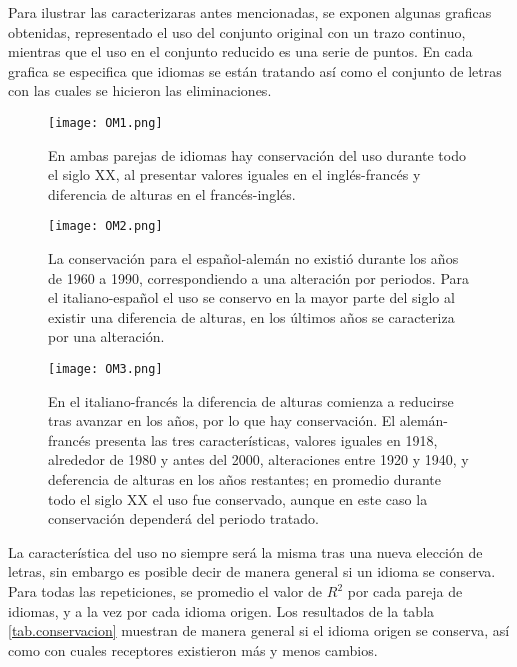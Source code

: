 Para ilustrar las caracterizaras antes mencionadas, se exponen algunas graficas obtenidas, representado el uso del conjunto original con un trazo continuo, mientras que el uso en el conjunto reducido  es una serie de puntos. En cada grafica se especifica que idiomas se están tratando así como el conjunto de letras con las cuales se hicieron las eliminaciones. 


\begin{figure}[h!]
	\centering
	\texttt{[image: OM1.png]}
	\label{fig.OM1}
	\caption{En ambas parejas de idiomas hay conservación del uso durante todo el siglo XX, al presentar valores iguales en el inglés-francés y  diferencia de alturas en el francés-inglés.}
\end{figure}


\begin{figure}[h!]
	\centering
	\texttt{[image: OM2.png]}
	\label{fig.OM2}
	\caption{La conservación para el español-alemán no existió durante los años de 1960 a 1990,  correspondiendo a una alteración por periodos. Para el italiano-español el uso se conservo  en la mayor parte del siglo al existir una diferencia de alturas, en los últimos años se caracteriza por una alteración.}
\end{figure}


\begin{figure}[h!]
	\centering
	\texttt{[image: OM3.png]}
	\label{fig.OM3}
	\caption{ En el italiano-francés la diferencia de alturas comienza a reducirse tras avanzar en los años, por lo que hay conservación. El alemán-francés  presenta las tres características,  valores iguales  en 1918, alrededor de 1980 y antes del 2000,  alteraciones entre 1920 y 1940, y deferencia de alturas  en los años restantes; en promedio durante todo el siglo XX el uso fue conservado, aunque en este caso la conservación dependerá del periodo tratado.}
\end{figure}


La característica del uso no siempre será la misma tras una nueva elección de letras, sin embargo  es posible decir de manera general si un idioma se conserva.  Para todas las repeticiones, se promedio el valor de $R^{2}$ por cada pareja de idiomas, y a la vez por cada idioma origen.  Los resultados de la tabla \ref{tab.conservacion} muestran de manera general si el idioma origen se conserva, así como con cuales receptores existieron más y menos cambios. 



